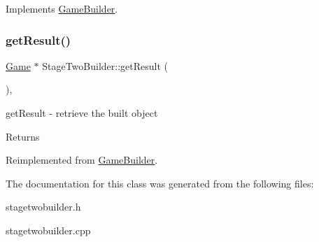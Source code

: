 Implements \mbox{\hyperlink{class_game_builder_a65fb629009c18956a8d592352eda1eb5}{Game\+Builder}}.

\mbox{\label{class_stage_two_builder_ac40c00c49b18b7c4f83f4474a8cd9c73}} 
\subsubsection{\texorpdfstring{get\+Result()}{getResult()}}
{\footnotesize\ttfamily \mbox{\hyperlink{class_game}{Game}} $\ast$ Stage\+Two\+Builder\+::get\+Result (\begin{DoxyParamCaption}{ }\end{DoxyParamCaption})\hspace{0.3cm}{\ttfamily [override]}, {\ttfamily [virtual]}}



get\+Result -\/ retrieve the built object 

\begin{DoxyReturn}{Returns}

\end{DoxyReturn}


Reimplemented from \mbox{\hyperlink{class_game_builder_a490e3dbb7f8289edb2a080a3383f8607}{Game\+Builder}}.



The documentation for this class was generated from the following files\+:\begin{DoxyCompactItemize}
\item 
stagetwobuilder.\+h\item 
stagetwobuilder.\+cpp\end{DoxyCompactItemize}
